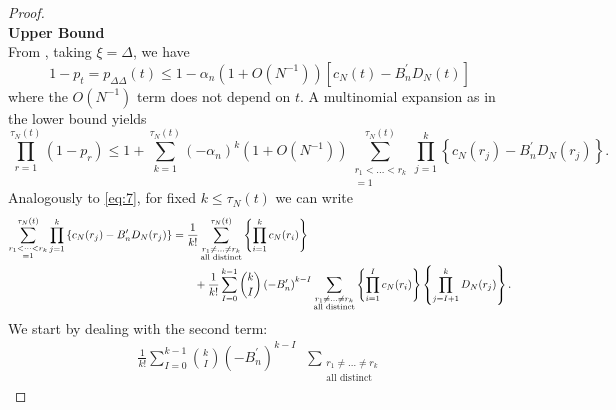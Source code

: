 \documentclass{article}
\newcommand{\E}{\mathbb{E}}
\newcommand{\1}[1]{\mathbbm{1}_{#1}}
\begin{document}
\begin{proof}
\textbf{\\Upper Bound}\\
From \citet[Lemma 1 Case 1]{koskela2018}, taking $\xi=\Delta$, we have
\begin{equation}\label{eq:28}
1-p_t = p_{\Delta\Delta}(t) \leq 1 - \alpha_n (1+O(N^{-1})) \left[ c_N(t) - B_n^\prime D_N(t) \right] 
\end{equation}
where the $O(N^{-1})$ term does not depend on $t$.
A multinomial expansion as in the lower bound yields
\begin{equation}\label{eq:29}
\prod_{r=1}^{\tau_N(t)} (1-p_r)
\leq 1 + \sum_{k=1}^{\tau_N(t)} (- \alpha_n)^k (1+O(N^{-1})) \sum_{\substack{r_1<\dots<r_k \\ =1}}^{\tau_N(t)}\prod_{j=1}^k 
\left\{ c_N(r_j) - B_n^\prime D_N(r_j) \right\} .
\end{equation}
Analogously to \eqref{eq:7}, for fixed $k\leq\tau_N(t)$ we can write
\begin{align}
\sum_{\substack{r_1<\dots<r_k \\ =1}}^{\tau_N(t)}\prod_{j=1}^k 
\left\{ c_N(r_j) - B_n^\prime D_N(r_j) \right\}
&= \frac{1}{k!} \sum_{\substack{r_1\neq\dots\neq r_k \\ \text{all distinct}}}^{\tau_N(t)}
\left\{ \prod_{i=1}^k c_N(r_i) \right\} \label{eq:18}\\
&\qquad + \frac{1}{k!} \sum_{I=0}^{k-1} \binom{k}{I} \left( -B_n^\prime \right)^{k-I}
\sum_{\substack{r_1\neq\dots\neq r_k \\ \text{all distinct}}}
\left\{ \prod_{i=1}^I c_N(r_i) \right\}
\left\{ \prod_{j=I+1}^k D_N(r_j) \right\} .\notag
\end{align}
We start by dealing with the second term:
\begin{align}
\frac{1}{k!} \sum_{I=0}^{k-1} \binom{k}{I} \left( -B_n^\prime \right)^{k-I}
&\sum_{\substack{r_1\neq\dots\neq r_k \\ \text{all distinct}}}

\end{align}
\end{proof}
\end{document}
